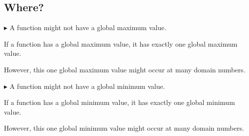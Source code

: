 \documentclass{ximera}
\begin{document}
\subsection*{Where?}


\textbf{\textcolor{blue!55!black}{$\blacktriangleright$}} A function might not have a global maximum value.

If a function has a global maximum value, it has exactly one global maximum value.

However, this one global maximum value might occur at many domain numbers.



\textbf{\textcolor{blue!55!black}{$\blacktriangleright$}} A function might not have a global minimum value.

If a function has a global minimum value, it has exactly one global minimum value.

However, this one global minimum value might occur at many domain numbers.
\end{document}
